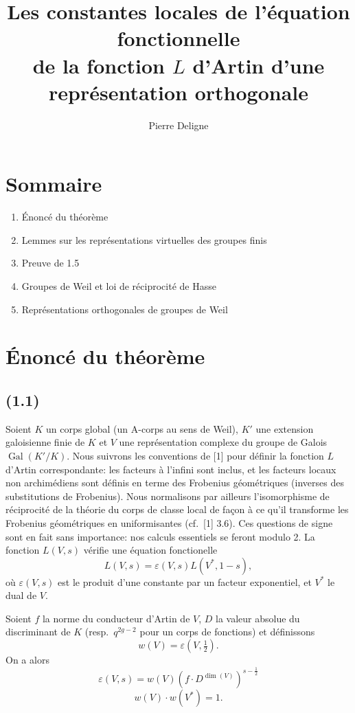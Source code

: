 \documentclass[11pt]{amsart}
\title{Les constantes locales de l'\'equation fonctionnelle\\
de la fonction $L$ d'Artin d'une repr\'esentation orthogonale}
\author{Pierre Deligne}
\theoremstyle{plain}
\theoremstyle{definition}
\DeclareMathOperator{\Gal}{Gal}
\begin{document}
\maketitle

\section*{Sommaire}
\begin{enumerate}
\item[1.] \'Enonc\'e du th\'eor\`eme 
\item[2.] Lemmes sur les repr\'esentations virtuelles des groupes finis 
\item[3.] Preuve de 1.5 
\item[4.] Groupes de Weil et loi de r\'eciprocit\'e de Hasse 
\item[5.] Repr\'esentations orthogonales de groupes de Weil 
\end{enumerate}

\section{\'Enonc\'e du th\'eor\`eme}

\subsection{(1.1)}
Soient $K$ un corps global (un A-corps au sens de Weil), $K'$ une extension galoisienne finie de $K$ et $V$ une repr\'esentation complexe du groupe de Galois $\Gal(K'/K)$. Nous suivrons les conventions de [1] pour d\'efinir la fonction $L$ d'Artin correspondante: les facteurs \`a l'infini sont inclus, et les facteurs locaux non archim\'ediens sont d\'efinis en terme des Frobenius g\'eom\'etriques (inverses des substitutions de Frobenius). Nous normalisons par ailleurs l'isomorphisme de r\'eciprocit\'e de la th\'eorie du corps de classe local de fa\c{c}on \`a ce qu'il transforme les Frobenius g\'eom\'etriques en uniformisantes (cf.~[1] 3.6). Ces questions de signe sont en fait sans importance: nos calculs essentiels se feront modulo 2. La fonction $L(V,s)$ v\'erifie une \'equation fonctionelle
\begin{equation}\label{eq:1.1.1}
L(V,s)=\varepsilon(V,s)L(V^*,1-s),
\end{equation}
o\`u $\varepsilon(V,s)$ est le produit d'une constante par un facteur exponentiel, et $V^*$ le dual de $V$.

Soient $f$ la norme du conducteur d'Artin de $V$, $D$ la valeur absolue du discriminant de $K$ (resp.~$q^{2g-2}$ pour un corps de fonctions) et d\'efinissons
\begin{equation}\label{eq:1.1.2}
w(V)=\varepsilon(V,\tfrac12).
\end{equation}
On a alors
\begin{equation}\label{eq:1.1.3}
\varepsilon(V,s)=w(V)(f\cdot D^{\dim(V)})^{s-\frac12}
\end{equation}
\begin{equation}\label{eq:1.1.4}
w(V)\cdot w(V^*)=1.
\end{equation}
\end{document}
